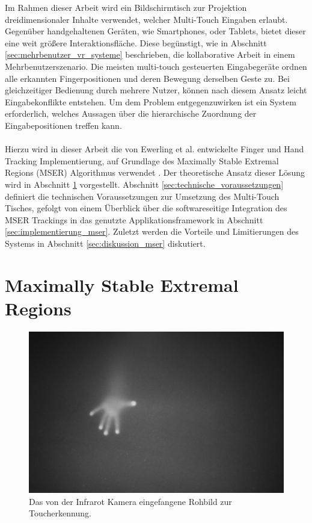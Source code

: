 Im Rahmen dieser Arbeit wird ein Bildschirmtisch zur Projektion dreidimensionaler Inhalte verwendet, welcher Multi-Touch Eingaben erlaubt. Gegenüber handgehaltenen Geräten, wie Smartphones, oder Tablets, bietet dieser eine weit größere Interaktionsfläche. Diese begünstigt, wie in Abschnitt \ref{sec:mehrbenutzer_vr_systeme} beschrieben, die kollaborative Arbeit in einem Mehrbenutzerszenario. Die meisten multi-touch gesteuerten Eingabegeräte ordnen alle erkannten Fingerpositionen und deren Bewegung derselben Geste zu. Bei gleichzeitiger Bedienung durch mehrere Nutzer, können nach diesem Ansatz leicht Eingabekonflikte entstehen. Um dem Problem entgegenzuwirken ist ein System erforderlich, welches Aussagen über die hierarchische Zuordnung der Eingabepositionen treffen kann.
\\\\
Hierzu wird in dieser Arbeit die von Ewerling et al. entwickelte Finger und Hand Tracking Implementierung, auf Grundlage des Maximally Stable Extremal Regions (MSER) Algorithmus verwendet \cite{matas:2004} \linebreak \cite{ewerling:2012}. Der theoretische Ansatz dieser Lösung wird in Abschnitt \ref{sec:maximally_stable_extremal_regions} vorgestellt. Abschnitt \ref{sec:technische_voraussetzungen} definiert die technischen Voraussetzungen zur Umsetzung des Multi-Touch Tisches, gefolgt von einem Überblick über die softwareseitige Integration des  MSER Trackings in das genutzte Applikationsframework in Abschnitt \ref{sec:implementierung_mser}. Zuletzt werden die Vorteile und Limitierungen des Systems in Abschnitt \ref{sec:diskussion_mser} diskutiert.


\section{Maximally Stable Extremal Regions}
\label{sec:maximally_stable_extremal_regions}

\begin{figure}
	\begin{center}
		\includegraphics[width=12cm]{img/mser_1.pdf}
	\end{center}
	\caption{Das von der Infrarot Kamera eingefangene Rohbild zur Toucherkennung.}
	\label{fig:mser_1}
\end{figure}

